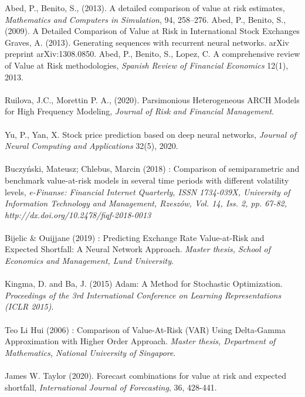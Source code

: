 \documentclass[a4paper,11pt,oneside]{book}
\begin{document}
Abed, P., Benito, S., (2013). A detailed comparison of value at risk estimates, \textit{Mathematics and Computers in Simulation}, 94, 258–276.\newline\newline
Abed, P., Benito, S., (2009). A Detailed Comparison of Value at Risk in International Stock Exchanges\newline\newline
Graves, A. (2013). Generating sequences with recurrent neural networks. arXiv preprint arXiv:1308.0850.\newline\newline
Abed, P., Benito, S., Lopez, C. A comprehensive review of Value at Risk methodologies, \textit{Spanish Review of Financial Economics} 12(1), 2013. \\\\
Ruilova, J.C., Morettin P. A., (2020). Parsimonious Heterogeneous ARCH Models for High
Frequency Modeling, \textit{Journal of Risk and Financial Management}.\\\\
Yu, P., Yan, X. Stock price prediction based on deep neural networks, \textit{Journal of Neural Computing and Applications} 32(5), 2020.\\\\
Buczyński, Mateusz; Chlebus, Marcin (2018) : Comparison of semiparametric
and benchmark value-at-risk models in several time periods with different volatility
levels, \textit{e-Finanse: Financial Internet Quarterly, ISSN 1734-039X, University of Information
Technology and Management, Rzeszów, Vol. 14, Iss. 2, pp. 67-82,
http://dx.doi.org/10.2478/fiqf-2018-0013}\\\\
Bijelic \& Ouijjane (2019) : Predicting Exchange Rate
Value-at-Risk and Expected Shortfall:
A Neural Network Approach. \textit{Master thesis, School of Economics and Management, Lund University}.\\\\
Kingma, D. and Ba, J. (2015) Adam: A Method for Stochastic Optimization. \textit{Proceedings of the 3rd International Conference on Learning Representations (ICLR 2015)}.\\\\
Teo Li Hui (2006) : Comparison of Value-At-Risk (VAR) Using Delta-Gamma
Approximation with Higher Order Approach. \textit{Master thesis, Department of Mathematics, National University of Singapore}.\\\\
James W. Taylor (2020). Forecast combinations for value at risk and expected shortfall, \textit{International Journal of Forecasting}, 36, 428-441.\\\\
\end{document}

